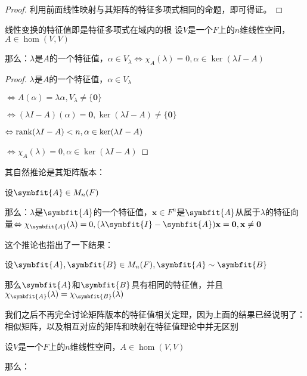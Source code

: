 \documentclass[12pt, a4paper, oneside, UTF8]{ctexbook}
\begin{document}
\begin{para}{0}
\begin{proof}
						利用前面线性映射与其矩阵的特征多项式相同的命题，即可得证。
					\end{proof}
				\point{}
					\begin{them}{线性变换的特征值即是特征多项式在域内的根}{}
						设$V$是一个$F$上的$n$维线性空间，$A \in \hom(V,V)$

						那么：$\lambda $是$A$的一个特征值，$\alpha \in V_\lambda \Leftrightarrow \chi_A(\lambda )=0,\alpha \in \ker(\lambda I-A)$
					\end{them}
					\begin{proof}
						$\lambda $是$A$的一个特征值，$\alpha \in V_\lambda$

						$\Leftrightarrow A(\alpha )=\lambda \alpha,V_\lambda \neq \{\mathbf{0}\}$

						$\Leftrightarrow (\lambda I-A)(\alpha )=\mathbf{0},\ker (\lambda I-A) \neq \{\mathbf{0}\}$

						$\Leftrightarrow \operatorname{rank}(\lambda I-A) < n,\alpha \in \ker(\lambda I-A)$

						$\Leftrightarrow \chi_A(\lambda )=0,\alpha \in \ker (\lambda I-A)$
					\end{proof}
					其自然推论是其矩阵版本：
					\begin{corollary}{}{}
						设$\symbfit{A} \in M_n(F)$

						那么：$\lambda $是$\symbfit{A}$的一个特征值，$\mathbf{x} \in F^n$是$\symbfit{A}$从属于$\lambda $的特征向量$\Leftrightarrow \chi_{\symbfit{A}}(\lambda )=0,(\lambda\symbfit{I}-\symbfit{A})\mathbf{x}=\mathbf{0},\mathbf{x}\neq \mathbf{0}$
					\end{corollary}
					这个推论也指出了一下结果：
					\begin{corollary}{}{}
						设$\symbfit{A},\symbfit{B} \in M_n(F),\symbfit{A}\sim \symbfit{B}$

						那么$\symbfit{A}$和$\symbfit{B}$具有相同的特征值，并且$\chi_{\symbfit{A}}(\lambda )=\chi_{\symbfit{B}}(\lambda )$
					\end{corollary}
					我们之后不再完全讨论矩阵版本的特征值相关定理，因为上面的结果已经说明了：相似矩阵，以及相互对应的矩阵和映射在特征值理论中并无区别
				\point{}
					\begin{proposition}
						设$V$是一个$F$上的$n$维线性空间，$A \in \hom(V,V)$

						那么：


\end{proposition}
\end{para}
\end{document}
